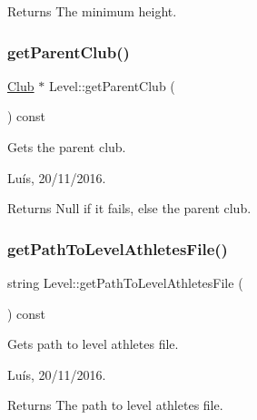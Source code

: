 \begin{DoxyReturn}{Returns}
The minimum height. 
\end{DoxyReturn}
\hypertarget{class_level_afa22f5ec13dde3359a636df38cf71377}{}\label{class_level_afa22f5ec13dde3359a636df38cf71377} 
\subsubsection{\texorpdfstring{get\+Parent\+Club()}{getParentClub()}}
{\footnotesize\ttfamily \hyperlink{class_club}{Club} $\ast$ Level\+::get\+Parent\+Club (\begin{DoxyParamCaption}{ }\end{DoxyParamCaption}) const}



Gets the parent club. 

Luís, 20/11/2016. 

\begin{DoxyReturn}{Returns}
Null if it fails, else the parent club. 
\end{DoxyReturn}
\hypertarget{class_level_a038f1525cd82ba7ff262c95559ae05f9}{}\label{class_level_a038f1525cd82ba7ff262c95559ae05f9} 
\subsubsection{\texorpdfstring{get\+Path\+To\+Level\+Athletes\+File()}{getPathToLevelAthletesFile()}}
{\footnotesize\ttfamily string Level\+::get\+Path\+To\+Level\+Athletes\+File (\begin{DoxyParamCaption}{ }\end{DoxyParamCaption}) const}



Gets path to level athletes file. 

Luís, 20/11/2016. 

\begin{DoxyReturn}{Returns}
The path to level athletes file. 
\end{DoxyReturn}
\hypertarget{class_level_ac779bf1052984fbcba0669139e639c46}{}\label{class_level_ac779bf1052984fbcba0669139e639c46} 
